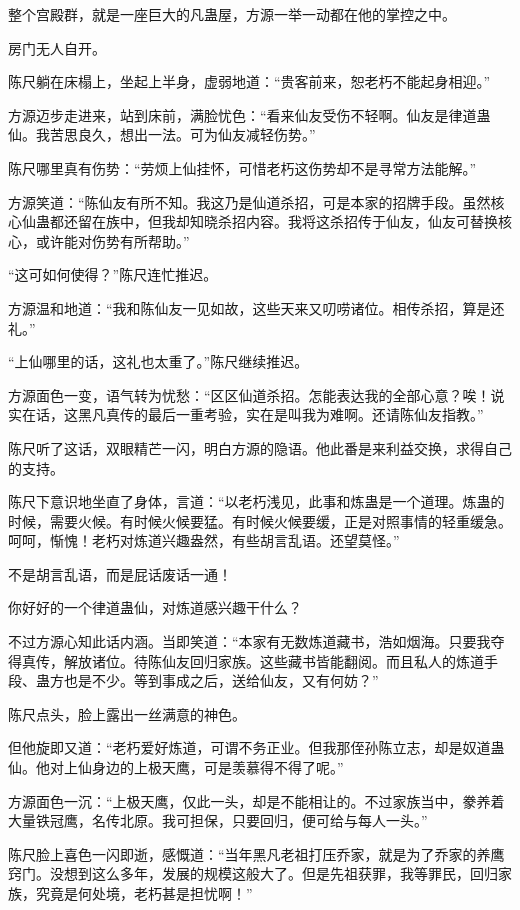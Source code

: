 \begin{this_body}
整个宫殿群，就是一座巨大的凡蛊屋，方源一举一动都在他的掌控之中。

房门无人自开。

陈尺躺在床榻上，坐起上半身，虚弱地道：“贵客前来，恕老朽不能起身相迎。”

方源迈步走进来，站到床前，满脸忧色：“看来仙友受伤不轻啊。仙友是律道蛊仙。我苦思良久，想出一法。可为仙友减轻伤势。”

陈尺哪里真有伤势：“劳烦上仙挂怀，可惜老朽这伤势却不是寻常方法能解。”

方源笑道：“陈仙友有所不知。我这乃是仙道杀招，可是本家的招牌手段。虽然核心仙蛊都还留在族中，但我却知晓杀招内容。我将这杀招传于仙友，仙友可替换核心，或许能对伤势有所帮助。”

“这可如何使得？”陈尺连忙推迟。

方源温和地道：“我和陈仙友一见如故，这些天来又叨唠诸位。相传杀招，算是还礼。”

“上仙哪里的话，这礼也太重了。”陈尺继续推迟。

方源面色一变，语气转为忧愁：“区区仙道杀招。怎能表达我的全部心意？唉！说实在话，这黑凡真传的最后一重考验，实在是叫我为难啊。还请陈仙友指教。”

陈尺听了这话，双眼精芒一闪，明白方源的隐语。他此番是来利益交换，求得自己的支持。

陈尺下意识地坐直了身体，言道：“以老朽浅见，此事和炼蛊是一个道理。炼蛊的时候，需要火候。有时候火候要猛。有时候火候要缓，正是对照事情的轻重缓急。呵呵，惭愧！老朽对炼道兴趣盎然，有些胡言乱语。还望莫怪。”

不是胡言乱语，而是屁话废话一通！

你好好的一个律道蛊仙，对炼道感兴趣干什么？

不过方源心知此话内涵。当即笑道：“本家有无数炼道藏书，浩如烟海。只要我夺得真传，解放诸位。待陈仙友回归家族。这些藏书皆能翻阅。而且私人的炼道手段、蛊方也是不少。等到事成之后，送给仙友，又有何妨？”

陈尺点头，脸上露出一丝满意的神色。

但他旋即又道：“老朽爱好炼道，可谓不务正业。但我那侄孙陈立志，却是奴道蛊仙。他对上仙身边的上极天鹰，可是羡慕得不得了呢。”

方源面色一沉：“上极天鹰，仅此一头，却是不能相让的。不过家族当中，豢养着大量铁冠鹰，名传北原。我可担保，只要回归，便可给与每人一头。”

陈尺脸上喜色一闪即逝，感慨道：“当年黑凡老祖打压乔家，就是为了乔家的养鹰窍门。没想到这么多年，发展的规模这般大了。但是先祖获罪，我等罪民，回归家族，究竟是何处境，老朽甚是担忧啊！”


\end{this_body}

